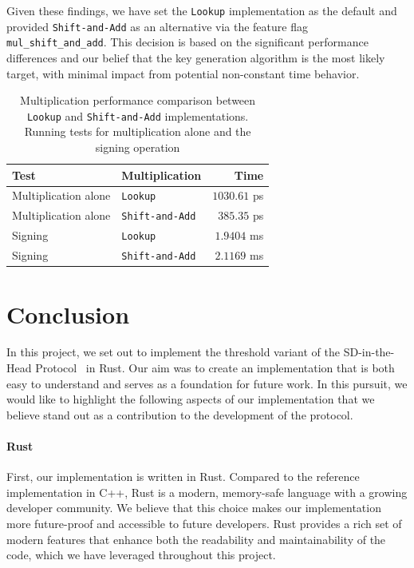 \documentclass[11pt]{report}
\theoremstyle{definition}
\theoremstyle{plain}
\begin{document}
Given these findings, we have set the \texttt{Lookup} implementation as the default and provided \texttt{Shift-and-Add} as an alternative via the feature flag \texttt{mul\_shift\_and\_add}. This decision is based on the significant performance differences and our belief that the key generation algorithm is the most likely target, with minimal impact from potential non-constant time behavior.

\begin{table}[h]
  \centering
  \begin{tabular}{|l|l|r|}
    \hline
    \textbf{Test}        & \textbf{Multiplication} & \textbf{Time} \\ \hline
    Multiplication alone & \texttt{Lookup}         & $1030.61$ ps  \\
    Multiplication alone & \texttt{Shift-and-Add}  & $385.35$ ps   \\
    Signing              & \texttt{Lookup}         & $1.9404$ ms   \\
    Signing              & \texttt{Shift-and-Add}  & $2.1169$ ms   \\
    \hline
  \end{tabular}
  \caption{Multiplication performance comparison between \texttt{Lookup} and \texttt{Shift-and-Add} implementations. Running tests for multiplication alone and the signing operation}\label{tab:mul_comparison}
\end{table}


\chapter{Conclusion}\label{ch:conclusion}

In this project, we set out to implement the threshold variant of the SD-in-the-Head Protocol~\cite{aguilarsyndrome11} in Rust. Our aim was to create an implementation that is both easy to understand and serves as a foundation for future work. In this pursuit, we would like to highlight the following aspects of our implementation that we believe stand out as a contribution to the development of the protocol.

\subsubsection{Rust}

First, our implementation is written in Rust. Compared to the reference implementation in C++, Rust is a modern, memory-safe language with a growing developer community. We believe that this choice makes our implementation more future-proof and accessible to future developers. Rust provides a rich set of modern features that enhance both the readability and maintainability of the code, which we have leveraged throughout this project.
\end{document}
